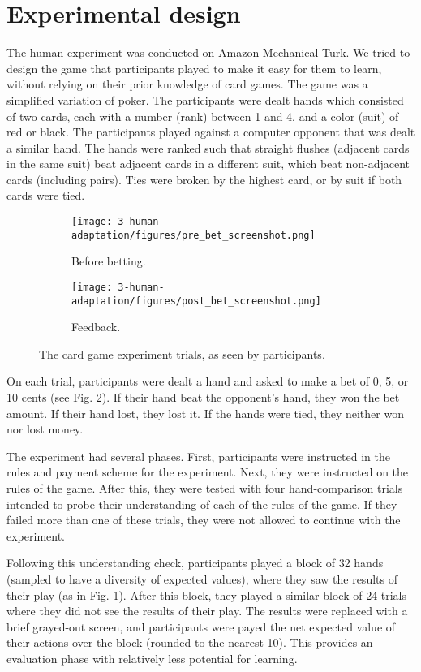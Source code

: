 \section{Experimental design}
The human experiment was conducted on Amazon Mechanical Turk. 
We tried to design the game that participants played to make it easy for them to learn, without relying on their prior knowledge of card games. The game was a simplified variation of poker. The participants were dealt hands which consisted of two cards, each with a number (rank) between 1 and 4, and a color (suit) of red or black. The participants played against a computer opponent that was dealt a similar hand. The hands were ranked such that straight flushes (adjacent cards in the same suit) beat adjacent cards in a different suit, which beat non-adjacent cards (including pairs). Ties were broken by the highest card, or by suit if both cards were tied. \par
\begin{figure}
\centering
\begin{subfigure}[b]{0.5\textwidth}
\texttt{[image: 3-human-adaptation/figures/pre\_bet\_screenshot.png]}
\caption{Before betting.}
\end{subfigure}%
\begin{subfigure}[b]{0.5\textwidth}
\texttt{[image: 3-human-adaptation/figures/post\_bet\_screenshot.png]}
\caption{Feedback.} \label{fig:human_betting_trial_feedback}
\end{subfigure}%
\caption{The card game experiment trials, as seen by participants.} \label{fig:human_betting_trial}
\end{figure}
On each trial, participants were dealt a hand and asked to make a bet of 0, 5, or 10 cents (see Fig. \ref{fig:human_betting_trial}). If their hand beat the opponent's hand, they won the bet amount. If their hand lost, they lost it. If the hands were tied, they neither won nor lost money. \par
The experiment had several phases. First, participants were instructed in the rules and payment scheme for the experiment. Next, they were instructed on the rules of the game. After this, they were tested with four hand-comparison trials intended to probe their understanding of each of the rules of the game. If they failed more than one of these trials, they were not allowed to continue with the experiment. \par
Following this understanding check, participants played a block of 32 hands (sampled to have a diversity of expected values), where they saw the results of their play (as in Fig. \ref{fig:human_betting_trial_feedback}). After this block, they played a similar block of 24 trials where they did not see the results of their play. The results were replaced with a brief grayed-out screen, and participants were payed the net expected value of their actions over the block (rounded to the nearest 10). This provides an evaluation phase with relatively less potential for learning. \par
